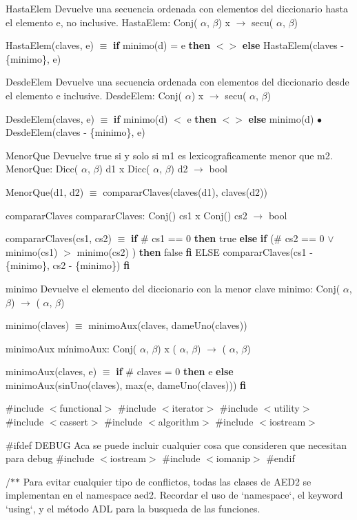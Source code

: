 \begin{DoxyParagraph}{\-Hasta\-Elem}
\-Devuelve una secuencia ordenada con elementos del diccionario hasta el elemento e, no inclusive. \-Hasta\-Elem\-: \-Conj( $\alpha$, $\beta$) x $\to$ secu( $\alpha$, $\beta$)\par
 \-Hasta\-Elem(claves, e) $\equiv$ {\bfseries if} minimo(d) = e {\bfseries then} $<$$>$ {\bfseries else} \-Hasta\-Elem(claves -\/ \{minimo\}, e) 
\end{DoxyParagraph}
\begin{DoxyParagraph}{\-Desde\-Elem}
\-Devuelve una secuencia ordenada con elementos del diccionario desde el elemento e inclusive. \-Desde\-Elem\-: \-Conj( $\alpha$) x $\to$ secu( $\alpha$, $\beta$)\par
 \-Desde\-Elem(claves, e) $\equiv$ {\bfseries if} minimo(d) $<$ e {\bfseries then} $<$$>$ {\bfseries else} minimo(d) $\bullet$ \-Desde\-Elem(claves -\/ \{minimo\}, e) 
\end{DoxyParagraph}
\begin{DoxyParagraph}{\-Menor\-Que}
\-Devuelve true si y solo si m1 es lexicograficamente menor que m2. \-Menor\-Que\-: \-Dicc( $\alpha$, $\beta$) d1 x \-Dicc( $\alpha$, $\beta$) d2 $\to$ bool\par
 \-Menor\-Que(d1, d2) $\equiv$ comparar\-Claves(claves(d1), claves(d2)) 
\end{DoxyParagraph}
\begin{DoxyParagraph}{comparar\-Claves}
comparar\-Claves\-: \-Conj() cs1 x \-Conj() cs2 $\to$ bool\par
 comparar\-Claves(cs1, cs2) $\equiv$ {\bfseries if} \# cs1 == 0 {\bfseries then} true {\bfseries else} {\bfseries if} (\# cs2 == 0 $\lor$ minimo(cs1) $>$ minimo(cs2) ) {\bfseries then} false {\bfseries fi} \-E\-L\-S\-E comparar\-Claves(cs1 -\/ \{minimo\}, cs2 -\/ \{minimo\}) {\bfseries fi} 
\end{DoxyParagraph}
\begin{DoxyParagraph}{minimo}
\-Devuelve el elemento del diccionario con la menor clave minimo\-: \-Conj( $\alpha$, $\beta$) $\to$ ( $\alpha$, $\beta$)\par
 minimo(claves) $\equiv$ minimo\-Aux(claves, dame\-Uno(claves)) 
\end{DoxyParagraph}
\begin{DoxyParagraph}{minimo\-Aux}
mínimo\-Aux\-: \-Conj( $\alpha$, $\beta$) x ( $\alpha$, $\beta$) $\to$ ( $\alpha$, $\beta$)\par
 minimo\-Aux(claves, e) $\equiv$ {\bfseries if} \# claves = 0 {\bfseries then} e {\bfseries else} minimo\-Aux(sin\-Uno(claves), max(e, dame\-Uno(claves))) {\bfseries fi} 
\end{DoxyParagraph}
\#include $<$functional$>$ \#include $<$iterator$>$ \#include $<$utility$>$ \#include $<$cassert$>$ \#include $<$algorithm$>$ \#include $<$iostream$>$

\#ifdef \-D\-E\-B\-U\-G \-Aca se puede incluir cualquier cosa que consideren que necesitan para debug \#include $<$iostream$>$ \#include $<$iomanip$>$ \#endif

/$\ast$$\ast$ \-Para evitar cualquier tipo de conflictos, todas las clases de \-A\-E\-D2 se implementan en el namespace aed2. \-Recordar el uso de `namespace`, el keyword `using`, y el método \-A\-D\-L para la busqueda de las funciones. 